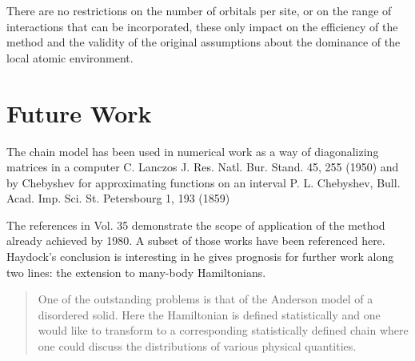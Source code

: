 \documentclass{article}
\begin{document}
There are no restrictions on the number of orbitals per site, or on the range of interactions that can be
incorporated, these only impact on the efficiency of the method and the validity of the original assumptions
about the dominance of the local atomic environment.

%

\section{Future Work}
The chain model has been used in numerical work as a way of diagonalizing matrices in a computer 
C. Lanczos J. Res. Natl. Bur. Stand. 45, 255 (1950) and
by Chebyshev for approximating functions on an interval
P. L. Chebyshev, Bull. Acad. Imp. Sci. St. Petersbourg 1, 193 (1859)

The references in Vol. 35 demonstrate the scope of application of the method 
already achieved by 1980. A subset of those works have been referenced here. 
Haydock's conclusion is interesting in he gives prognosis for further work
along two lines: the extension to many-body Hamiltonians.

\begin{quote}
One of the outstanding problems is that of the Anderson model
of a disordered solid. Here the Hamiltonian is defined statistically and
one would like to transform to a corresponding statistically defined chain where
one could discuss the distributions of various physical quantities.
\end{quote}
\end{document}
